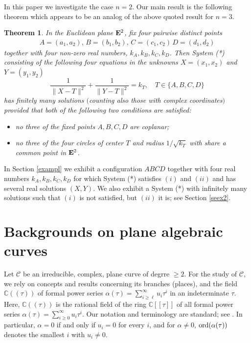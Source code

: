 \documentclass[10pt]{amsart}
\newtheorem{thm}{Theorem}[section]
\theoremstyle{definition}
\theoremstyle{remark}
\def\cC{\mathcal C}
\begin{document}
In this paper we investigate the case $n=2$. Our main result is the following theorem which appears to be an analog of the above quoted result for $n=3$.  
\begin{thm}
\label{main}
In the Euclidean plane ${\bf{E}}^2$, fix four pairwise distinct points
\begin{equation*}
\label{eqA}
\begin{array}{ccc}
A=(a_1,a_2),\, B=(b_1,b_2),\, C=(c_1,c_2)\, D=(d_1,d_2)
\end{array}
\end{equation*}
together with four non-zero real numbers, $k_A,k_B,k_C,k_D$. Then System (*) consisting of the following four equations
in the unknowns $X=(x_1,x_2)$ and $Y=(y_1,y_2)$
\begin{equation}
\label{egy}
\frac{1}{\|X-T\|^2}  +\frac{1}{\|Y-T\|^2}=k_T, \quad T\in\{A,B,C,D\}
\end{equation}
has finitely many solutions $($counting also those with complex coordinates$)$ provided that both of the following two conditions are satisfied:
\begin{itemize}
\item[$(i)$] no three of the fixed points $A,B,C,D$ are coplanar;
\item[$(ii)$] no three of the four circles of center $T$ and radius $1/\sqrt{k_T}$ with
share a common point in ${\bf{E}}^2$.
\end{itemize}
\end{thm}
In Section \ref{exampl}  we exhibit a configuration $ABCD$ together with four real numbers $k_A,k_B,k_C,k_D$ for which System (*) satisfies $(i)$ and $(ii)$ and has several real solutions $(X,Y)$. 
We also exhibit a System (*) with infinitely many solutions such that $(i)$ is not satisfied, but $(ii)$ it is; see Section  \ref{seex2}.  
\section{Backgrounds on plane algebraic curves}
Let $\cC$ be an irreducible, complex, plane curve of degrre $\geq 2$. For the study of $\cC$, we rely on concepts and results concerning its branches (places), and the field $\mathbb{C}((\tau))$ of formal power series $\alpha(\tau)=\sum\limits_{i\ge \ell}^{\infty}u_i\tau^i$ in an indeterminate $\tau$. Here, $\mathbb{C}((\tau))$ is the rational field of the ring $\mathbb{C}[[\tau]]$ of all formal power series $\alpha(\tau)=\sum\limits_{i\ge 0}^{\infty}u_i\tau^i$.
Our notation and terminology are standard; see \cite{lefschetz2012algebraic,shafaverich2013basic,seidenberg1968}. In particular, $\alpha=0$ if and only if $u_i=0$ for every $i$, and for $\alpha\neq 0$, ${\rm{ord}}(\alpha(\tau))$ denotes the smallest $i$ with $u_i\neq 0$.
\end{document}
